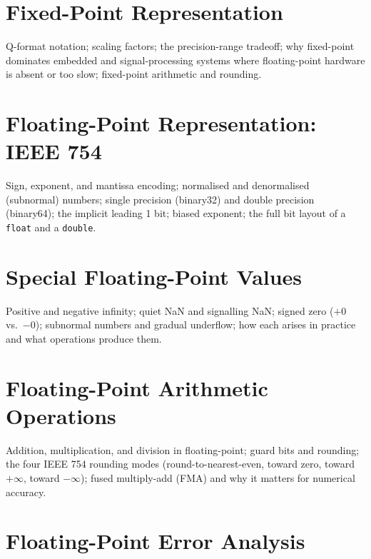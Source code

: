 \chapter{Fixed-Point Representation}
\label{ch:fixed-point}

Q-format notation; scaling factors; the precision-range tradeoff; why
fixed-point dominates embedded and signal-processing systems where
floating-point hardware is absent or too slow; fixed-point arithmetic
and rounding.



\chapter{Floating-Point Representation: IEEE 754}
\label{ch:ieee754}

Sign, exponent, and mantissa encoding; normalised and denormalised
(subnormal) numbers; single precision (binary32) and double precision
(binary64); the implicit leading 1 bit; biased exponent; the full bit
layout of a \texttt{float} and a \texttt{double}.

\chapter{Special Floating-Point Values}
\label{ch:float-specials}

Positive and negative infinity; quiet NaN and signalling NaN; signed zero
($+0$ vs.\ $-0$); subnormal numbers and gradual underflow; how each arises
in practice and what operations produce them.

\chapter{Floating-Point Arithmetic Operations}
\label{ch:float-arithmetic}

Addition, multiplication, and division in floating-point; guard bits and
rounding; the four IEEE 754 rounding modes (round-to-nearest-even, toward
zero, toward $+\infty$, toward $-\infty$); fused multiply-add (FMA) and
why it matters for numerical accuracy.

\chapter{Floating-Point Error Analysis}
\label{ch:float-error}

